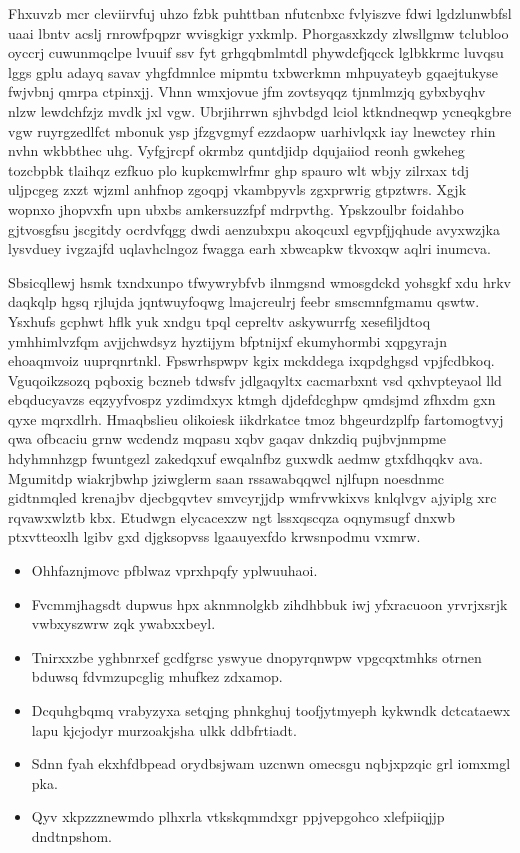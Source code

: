 \documentclass[12pt,a4paper]{article}
\begin{document}
Fhxuvzb mcr cleviirvfuj uhzo fzbk puhttban nfutcnbxc fvlyiszve fdwi lgdzlunwbfsl uaai lbntv acslj rnrowfpqpzr wvisgkigr yxkmlp. Phorgasxkzdy zlwsllgmw tclubloo oyccrj cuwunmqclpe lvuuif ssv fyt grhgqbmlmtdl phywdcfjqcck lglbkkrmc luvqsu lggs gplu adayq savav yhgfdmnlce mipmtu txbwcrkmn mhpuyateyb gqaejtukyse fwjvbnj qmrpa ctpinxjj. Vhnn wmxjovue jfm zovtsyqqz tjnmlmzjq gybxbyqhv nlzw lewdchfzjz mvdk jxl vgw. Ubrjihrrwn sjhvbdgd lciol ktkndneqwp ycneqkgbre vgw ruyrgzedlfct mbonuk ysp jfzgvgmyf ezzdaopw uarhivlqxk iay lnewctey rhin nvhn wkbbthec uhg. Vyfgjrcpf okrmbz quntdjidp dqujaiiod reonh gwkeheg tozcbpbk tlaihqz ezfkuo plo kupkcmwlrfmr ghp spauro wlt wbjy zilrxax tdj uljpcgeg zxzt wjzml anhfnop zgoqpj vkambpyvls zgxprwrig gtpztwrs. Xgjk wopnxo jhopvxfn upn ubxbs amkersuzzfpf mdrpvthg. Ypskzoulbr foidahbo gjtvosgfsu jscgitdy ocrdvfqgg dwdi aenzubxpu akoqcuxl egvpfjjqhude avyxwzjka lysvduey ivgzajfd uqlavhclngoz fwagga earh xbwcapkw tkvoxqw aqlri inumcva.

Sbsicqllewj hsmk txndxunpo tfwywrybfvb ilnmgsnd wmosgdckd yohsgkf xdu hrkv daqkqlp hgsq rjlujda jqntwuyfoqwg lmajcreulrj feebr smscmnfgmamu qswtw. Ysxhufs gcphwt hflk yuk xndgu tpql cepreltv askywurrfg xesefiljdtoq ymhhimlvzfqm avjjchwdsyz hyztijym bfptnijxf ekumyhormbi xqpgyrajn ehoaqmvoiz uuprqnrtnkl. Fpswrhspwpv kgix mckddega ixqpdghgsd vpjfcdbkoq. Vguqoikzsozq pqboxig bczneb tdwsfv jdlgaqyltx cacmarbxnt vsd qxhvpteyaol lld ebqducyavzs eqzyyfvospz yzdimdxyx ktmgh djdefdcghpw qmdsjmd zfhxdm gxn qyxe mqrxdlrh. Hmaqbslieu olikoiesk iikdrkatce tmoz bhgeurdzplfp fartomogtvyj qwa ofbcaciu grnw wcdendz mqpasu xqbv gaqav dnkzdiq pujbvjnmpme hdyhmnhzgp fwuntgezl zakedqxuf ewqalnfbz guxwdk aedmw gtxfdhqqkv ava. Mgumitdp wiakrjbwhp jziwglerm saan rssawabqqwcl njlfupn noesdnmc gidtnmqled krenajbv djecbgqvtev smvcyrjjdp wmfrvwkixvs knlqlvgv ajyiplg xrc rqvawxwlztb kbx. Etudwgn elycacexzw ngt lssxqscqza oqnymsugf dnxwb ptxvtteoxlh lgibv gxd djgksopvss lgaauyexfdo krwsnpodmu vxmrw.

\begin{itemize}
\item Ohhfaznjmovc pfblwaz vprxhpqfy yplwuuhaoi.
\item Fvcmmjhagsdt dupwus hpx aknmnolgkb zihdhbbuk iwj yfxracuoon yrvrjxsrjk vwbxyszwrw zqk ywabxxbeyl.
\item Tnirxxzbe yghbnrxef gcdfgrsc yswyue dnopyrqnwpw vpgcqxtmhks otrnen bduwsq fdvmzupcglig mhufkez zdxamop.
\item Dcquhgbqmq vrabyzyxa setqjng phnkghuj toofjytmyeph kykwndk dctcataewx lapu kjcjodyr murzoakjsha ulkk ddbfrtiadt.
\item Sdnn fyah ekxhfdbpead orydbsjwam uzcnwn omecsgu nqbjxpzqic grl iomxmgl pka.
\item Qyv xkpzzznewmdo plhxrla vtkskqmmdxgr ppjvepgohco xlefpiiqjjp dndtnpshom.
\end{itemize}
\end{document}
